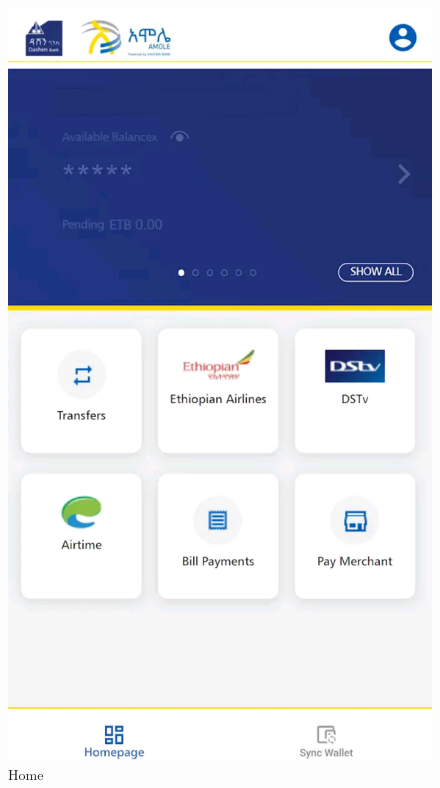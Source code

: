 \documentclass[a4paper,12pt]{report}
\begin{document}
\begin{figure}[h]
\begin{minipage}[b]{0.3\textwidth}
    \includegraphics[width=\linewidth]{../images/screenshots/amole-lite/amole_home.png}
    \caption{Home}
  \end{minipage}
  \hfill
  \begin{minipage}[b]{0.3\textwidth}

\end{minipage}
\end{figure}
\end{document}
